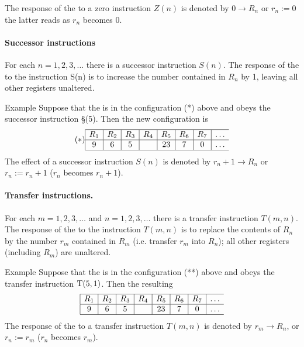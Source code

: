 The response of the \URM to a zero instruction $Z(n)$ is denoted by $0\rightarrow R_n$ or $r_n :=0$ the latter reads as $r_n$ becomes 0.


\paragraph{Successor instructions} For each $n = 1,2,3,\dots$ there is a successor 
instruction $S(n)$. The response of the \URM to the instruction S(n) is to 
increase the number contained in $R_n$ by 1, leaving all other registers 
unaltered. 

Example Suppose that the \URM is in the configuration (*) 
above and obeys the successor instruction \S(5). Then the new  
configuration is 
\[(*)
\begin{array}{|c|c|c|c|c|c|c|c}
\hline
R_1 & R_2 &R_3 &R_4 &R_5 &R_6 &R_7 &\dots\\
\hline
9 & 6  &5  &  &23  &7  &0  &\dots\\
\hline
\end{array}
\]
The effect of a successor instruction $S(n)$ is denoted by $r_n+1\rightarrow R_n$ or 
$r_n := r_n+1$ ($r_n$ becomes $r_n +1$). 

\paragraph{Transfer instructions.} For each $m = 1, 2, 3,\dots$ and $n = 1, 2, 3,\dots$ there 
is a transfer instruction $T(m,n)$. The response of the \URM to the 
instruction $T(m, n)$ is to replace the contents of $R_n$ by the number $r_m$ 
contained in $R_m$ (i.e. transfer $r_m$ into $R_n$); all other registers (including 
$R_m$) are unaltered. 

Example Suppose that the \URM is in the configuration (**) 
above and obeys the transfer instruction ${\rm T}(5,1)$. Then the resulting 
\begin{equation}
\begin{array}{|c|c|c|c|c|c|c|c}
\hline
R_1 & R_2 &R_3 &R_4 &R_5 &R_6 &R_7 &\dots\\
\hline
9 & 6  &5  &  &23  &7  &0  &\dots\\
\hline
\end{array}
\end{equation}
The response of the \URM to a transfer instruction $T(m, n)$ is denoted by 
$r_m\rightarrow R_n$, or $r_n := r_m$ ($r_n$ becomes $r_m$).

